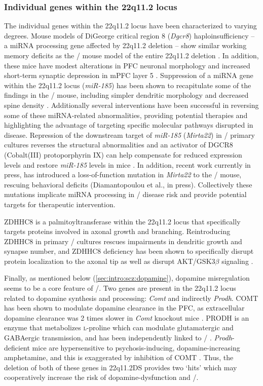 \subsubsection{Individual genes within the 22q11.2 locus}
The individual genes within the 22q11.2 locus have been characterized to varying degrees.
Mouse models of DiGeorge critical region 8 (\textit{Dgcr8}) haploinsufficiency -- a \ac{miRNA} processing gene affected by 22q11.2 deletion -- show similar working memory deficits as the \df/ mouse model of the entire 22q11.2 deletion \citep{Stark2008}.
In addition, these mice have modest alterations in \ac{PFC} neuronal morphology and increased short-term synaptic depression in mPFC layer 5 \citep{Fenelon2011}.
Suppression of a \ac{miRNA} gene within the 22q11.2 locus (\textit{miR-185}) has been shown to recapitulate some of the findings in the \df/ mouse, including simpler dendritic morphology and decreased spine density \citep{Xu2013a}.
Additionally several interventions have been successful in reversing some of these \ac{miRNA}-related abnormalities, providing potential therapies and highlighting the advantage of targeting specific molecular pathways disrupted in disease.
Repression of the downstream target of \textit{miR-185} (\textit{Mirta22}) in \df/ primary cultures reverses the structural abnormalities \citep{Xu2013a} and an activator of DGCR8 (Cobalt(III) protoporphyrin IX) can help compensate for reduced expression levels and restore \textit{miR-185} levels in mice \citep{Barr2015}.
In addition, recent work currently in press, has introduced a loss-of-function mutation in \textit{Mirta22} to the \df/ mouse, rescuing behavioral deficits (Diamantopoulou et al., in press).
Collectively these mutations implicate \ac{miRNA} processing in \scz/ disease risk and provide potential targets for therapeutic intervention.

ZDHHC8 is a palmitoyltransferase within the 22q11.2 locus that specifically targets proteins involved in axonal growth and branching.
Reintroducing ZDHHC8 in primary \df/ cultures rescues impairments in dendritic growth and synapse number, and ZDHHC8 deficiency has been shown to specifically disrupt protein localization to the axonal tip as well as disrupt AKT/GSK3$\beta$ signaling \citep{Mukai2008, Mukai2015}.

Finally, as mentioned below (\autoref{sec:intro:scz:dopamine}), dopamine misregulation seems to be a core feature of \scz/.
Two genes are present in the 22q11.2 locus related to dopamine synthesis and processing: \textit{Comt} and indirectly \textit{Prodh}.
COMT has been shown to modulate dopamine clearance in the \ac{PFC}, as extracellular dopamine clearance was 2 times slower in \textit{Comt} knockout mice \citep{Kaenmaki2010}.
PRODH is an enzyme that metabolizes \textsc{l}-proline which can modulate glutamatergic and GABAergic transmission, and has been independently linked to \scz/ \citep{Liu2002, Crabtree2016}.
\textit{Prodh}-deficient mice are hypersensitive to psychosis-inducing, dopamine-increasing amphetamine, and this is exaggerated by inhibition of COMT \citep{Paterlini2005}. 
Thus, the deletion of both of these genes in 22q11.2DS provides two `hits' which may cooperatively increase the risk of dopamine-dysfunction and \scz/.


